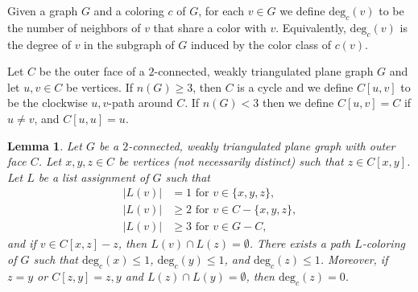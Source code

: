\documentclass[12pt,letterpaper]{article}
\theoremstyle{plain}
\newtheorem{lemma}{Lemma}[section]           %
\theoremstyle{definition}
\theoremstyle{break}
\begin{document}
Given a graph $G$ and a coloring $c$ of $G$, for each $v\in G$ we
define $\text{deg}_c(v)$ to be the number of neighbors of $v$ that share a color
with $v$. Equivalently, $\text{deg}_c(v)$ is the degree of $v$ in the subgraph
of $G$ induced by the color class of $c(v)$.

Let $C$ be the outer face of a $2$-connected, weakly triangulated plane graph
$G$ and let $u,v\in C$ be vertices.
If $n(G)\ge3$, then $C$ is a cycle and we
define $C[u,v]$ to be the clockwise $u,v$-path
around $C$. If $n(G)<3$ then we define $C[u,v]=C$ if
$u\ne v$, and $C[u,u]=u$.

\begin{lemma}\label{L:hartman3}
Let $G$ be a $2$-connected, weakly triangulated plane graph with outer face
$C$. Let $x,y,z\in C$ be vertices (not necessarily distinct) such that
$z\in C[x,y]$. Let $L$ be a list assignment of $G$ such that
\begin{align*}
    |L(v)| &= 1 \text{ for } v\in\{x,y,z\},\\
    |L(v)| &\ge 2 \text{ for } v\in C-\{x,y,z\},\\
    |L(v)| &\ge 3 \text{ for } v\in G-C,
\end{align*}
and if $v\in C[x,z]-z$, then $L(v)\cap L(z)=\emptyset$.
There exists a path $L$-coloring of $G$ such that $\text{deg}_c(x)\le 1$,
$\text{deg}_c(y)\le 1$, and $\text{deg}_c(z)\le 1$. Moreover,
if $z=y$ or $C[z,y]=z,y$ and $L(z)\cap L(y)=\emptyset$,
then $\text{deg}_c(z)=0$.
\end{lemma}
\end{document}
